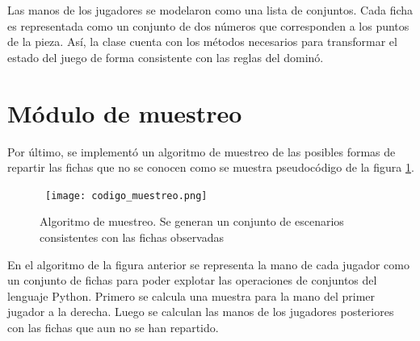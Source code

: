Las manos de los jugadores se modelaron como una lista de conjuntos. Cada ficha es 
representada como un conjunto de dos números que corresponden a los puntos de la pieza. 
Así, la clase cuenta con los métodos necesarios para transformar el estado del juego de 
forma consistente con las reglas del dominó.

\section{Módulo de muestreo}

Por último, se implementó un algoritmo de muestreo de las posibles formas de repartir las 
fichas que no se conocen como se muestra pseudocódigo de la figura \ref{CM}. 

\begin{figure}[ht]
\begin{center}
\hbox{\hspace{-1.5em} \texttt{[image: codigo\_muestreo.png]}}
\caption{Algoritmo de muestreo. Se generan un conjunto de escenarios consistentes con las fichas observadas}
\label{CM}
\end{center}
\end{figure}

En el algoritmo de la figura anterior se representa la mano de cada jugador como un 
conjunto de fichas para poder explotar las operaciones de conjuntos del lenguaje Python. 
Primero se calcula una muestra para la mano del primer jugador a la derecha. Luego se 
calculan las manos de los jugadores posteriores con las fichas que aun no se han repartido.



